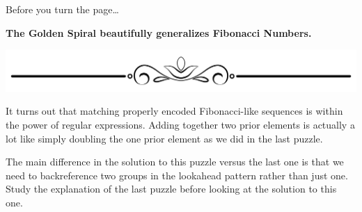 Before you turn the page\ldots{}

\textbf{The Golden Spiral beautifully generalizes Fibonacci Numbers.}

\includegraphics{images/Elegant-Flourish-Frame-Extrapolated-19.svg}

\newpage

It turns out that matching properly encoded Fibonacci-like sequences is
within the power of regular expressions. Adding together two prior
elements is actually a lot like simply doubling the one prior element as
we did in the last puzzle.

The main difference in the solution to this puzzle versus the last one
is that we need to backreference two groups in the lookahead pattern
rather than just one. Study the explanation of the last puzzle before
looking at the solution to this one.

\begin{Shaded}
\begin{Highlighting}[]
\OperatorTok{\textgreater{}\textgreater{}\textgreater{}}\OperatorTok{=} 
\OperatorTok{\textgreater{}\textgreater{}\textgreater{}}\OperatorTok{=} 
\OperatorTok{\textgreater{}\textgreater{}\textgreater{}} 
\OperatorTok{=}
\NormalTok{(}
\NormalTok{:}
\NormalTok{(}
     
     
     
     
     
\end{Highlighting}
\end{Shaded}

